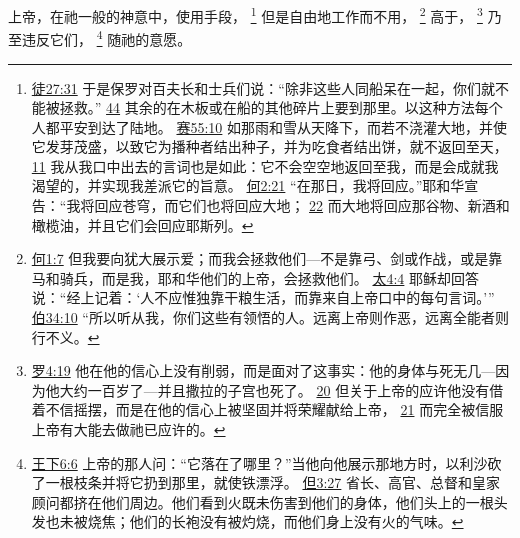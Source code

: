 \documentclass[12pt, a4paper, oneside]{ctexart}
\newcounter{parnum}[section]
\newcommand{\N}{%
   \noindent\refstepcounter{parnum}%
    \makebox[\parindent][l]{\textbf{\arabic{parnum}.}}}
\begin{document}
\N 上帝，在祂一般的神意中，使用手段，
	\footnote {
		\href{https://biblehub.com/acts/27-31.htm}{徒27:31} 于是保罗对百夫长和士兵们说：“除非这些人同船呆在一起，你们就不能被拯救。”
		\href{https://biblehub.com/acts/27-44.htm}{44} 其余的在木板或在船的其他碎片上要到那里。以这种方法每个人都平安到达了陆地。
		\href{https://biblehub.com/isaiah/55-10.htm}{赛55:10} 如那雨和雪从天降下，而若不浇灌大地，并使它发芽茂盛，以致它为播种者结出种子，并为吃食者结出饼，就不返回至天，
		\href{https://biblehub.com/isaiah/55-11.htm}{11} 我从我口中出去的言词也是如此：它不会空空地返回至我，而是会成就我渴望的，并实现我差派它的旨意。
		\href{https://biblehub.com/hosea/2-21.htm}{何2:21} “在那日，我将回应。”耶和华宣告：“我将回应苍穹，而它们也将回应大地；
		\href{https://biblehub.com/hosea/2-22.htm}{22} 而大地将回应那谷物、新酒和橄榄油，并且它们会回应耶斯列。
	}
	但是自由地工作而不用，
	\footnote {
		\href{https://biblehub.com/hosea/1-7.htm}{何1:7} 但我要向犹大展示爱；而我会拯救他们---不是靠弓、剑或作战，或是靠马和骑兵，而是我，耶和华他们的上帝，会拯救他们。
		\href{https://biblehub.com/matthew/4-4.htm}{太4:4} 耶稣却回答说：“经上记着：‘人不应惟独靠干粮生活，而靠来自上帝口中的每句言词。’” 
		\href{https://biblehub.com/job/34-10.htm}{伯34:10} “所以听从我，你们这些有领悟的人。远离上帝则作恶，远离全能者则行不义。	
	}
	高于，
	\footnote {
		\href{https://biblehub.com/romans/4-19.htm}{罗4:19} 他在他的信心上没有削弱，而是面对了这事实：他的身体与死无几---因为他大约一百岁了---并且撒拉的子宫也死了。
		\href{https://biblehub.com/romans/4-20.htm}{20} 但关于上帝的应许他没有借着不信摇摆，而是在他的信心上被坚固并将荣耀献给上帝，
		\href{https://biblehub.com/romans/4-21.htm}{21} 而完全被信服上帝有大能去做祂已应许的。
	}
	乃至违反它们，
	\footnote {
		\href{https://biblehub.com/2_kings/6-6.htm}{王下6:6} 上帝的那人问：“它落在了哪里？”当他向他展示那地方时，以利沙砍了一根枝条并将它扔到那里，就使铁漂浮。
		\href{https://biblehub.com/daniel/3-27.htm}{但3:27} 省长、高官、总督和皇家顾问都挤在他们周边。他们看到火既未伤害到他们的身体，他们头上的一根头发也未被烧焦；他们的长袍没有被灼烧，而他们身上没有火的气味。
	}
	随祂的意愿。
\end{document}
